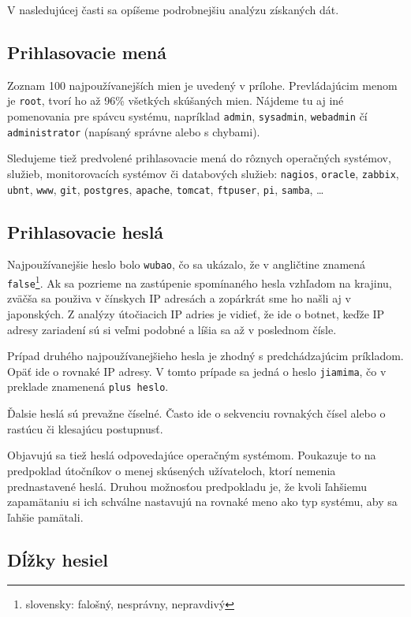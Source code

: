 \documentclass[12pt, oneside]{book}
\begin{document}
V nasledujúcej časti sa opíšeme podrobnejšiu analýzu získaných dát.

\subsection{Prihlasovacie mená}

Zoznam 100 najpoužívanejších mien je uvedený v prílohe.
Pre\-vlá\-da\-jú\-cim menom je \texttt{root}, tvorí ho až 96\% všetkých skúšaných mien.
Nájdeme tu aj iné pomenovania pre spávcu systému, napríklad \texttt{admin}, \texttt{sysadmin}, \texttt{webadmin} čí \texttt{administrator} (napísaný správne alebo s chybami).

Sledujeme tiež predvolené prihlasovacie mená do rôznych operačných sys\-té\-mov, služieb, monitorovacích systémov či databových služieb: \texttt{nagios}, \texttt{oracle}, \texttt{zabbix}, \texttt{ubnt}, \texttt{www}, \texttt{git}, \texttt{postgres}, \texttt{apache}, \texttt{tomcat}, \texttt{ftpuser}, \texttt{pi}, \texttt{samba}, \dots

\subsection{Prihlasovacie heslá}

Najpoužívanejšie heslo bolo \texttt{wubao}, čo sa ukázalo, že v angličtine znamená \texttt{false}\footnote{slovensky: falošný, nesprávny, nepravdivý}.
Ak sa pozrieme na zastúpenie spomínaného hesla vzhľadom na krajinu, zväčša sa použiva v čínskych IP adresách a zopárkrát sme ho našli aj v japonských.
Z analýzy útočiacich IP adries je vidieť, že ide o botnet,
keďže IP adresy zariadení sú si veľmi podobné a líšia sa až v poslednom čísle.

Prípad druhého najpoužívanejšieho hesla je zhodný s predchádzajúcim prí\-kla\-dom.
Opäť ide o rovnaké IP adresy.
V tomto prípade sa jedná o heslo \texttt{jiamima}, čo v preklade znamenená \texttt{plus heslo}. 

Ďalsie heslá sú prevažne číselné. Často ide o sekvenciu rovnakých čísel alebo o rastúcu či klesajúcu postupnusť.

Objavujú sa tiež heslá odpovedajúce operačným systémom. Poukazuje to na predpoklad útočníkov o menej skúsených užívateloch, ktorí nemenia prednastavené heslá. Druhou možnosťou predpokladu je, že kvoli ľahšiemu zapamätaniu si ich schválne nastavujú na rovnaké meno ako typ systému, aby sa ľahšie pamätali.

\subsection{Dĺžky hesiel}
\end{document}
